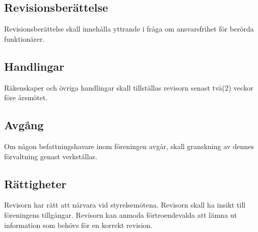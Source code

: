 \documentclass[11pt,a4paper]{article}
\begin{document}
\subsection{Revisionsberättelse}
Revisionsberättelse skall innehålla yttrande i fråga om ansvarsfrihet för berörda 
funktionärer. 
\subsection{Handlingar}
Räkenskaper och övriga handlingar skall tillställas revisorn senast två(2) veckor före årsmötet.
\subsection{Avgång}
Om någon befattningshavare inom föreningen avgår, skall granskning av dennes 
förvaltning genast verkställas.
\subsection{Rättigheter}
Revisorn har rätt att närvara vid styrelsemötena. Revisorn skall ha insikt till föreningens tillgångar. Revisorn kan anmoda förtroendevalda att lämna ut information som behövs för en korrekt revision.
\end{document}
